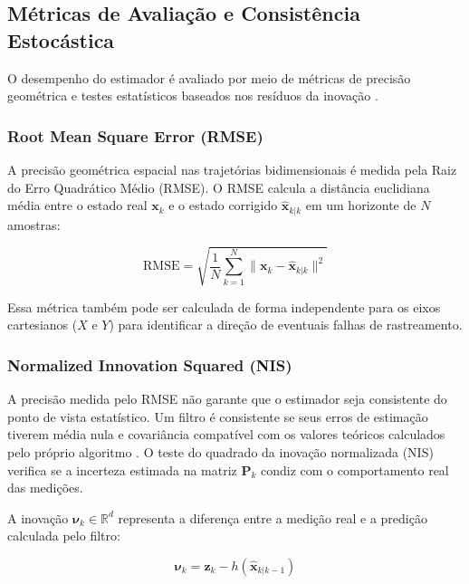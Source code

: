 \subsection{Métricas de Avaliação e Consistência Estocástica}
\label{subsec:metricas_validacao}

O desempenho do estimador é avaliado por meio de métricas de precisão geométrica e testes estatísticos baseados nos resíduos da inovação \cite{barshalom2001estimation}.

\subsubsection{Root Mean Square Error (RMSE)}

A precisão geométrica espacial nas trajetórias bidimensionais é medida pela Raiz do Erro Quadrático Médio (RMSE). O RMSE calcula a distância euclidiana média entre o estado real $\mathbf{x}_k$ e o estado corrigido $\hat{\mathbf{x}}_{k|k}$ em um horizonte de $N$ amostras:

\begin{equation}
    \label{eq:rmse}
    \text{RMSE} = \sqrt{\frac{1}{N} \sum_{k=1}^{N} \|\mathbf{x}_k - \hat{\mathbf{x}}_{k|k}\|^2}
\end{equation}

Essa métrica também pode ser calculada de forma independente para os eixos cartesianos ($X$ e $Y$) para identificar a direção de eventuais falhas de rastreamento.

\subsubsection{Normalized Innovation Squared (NIS)}

A precisão medida pelo RMSE não garante que o estimador seja consistente do ponto de vista estatístico. Um filtro é consistente se seus erros de estimação tiverem média nula e covariância compatível com os valores teóricos calculados pelo próprio algoritmo \cite{barshalom2001estimation}. O teste do quadrado da inovação normalizada (NIS) verifica se a incerteza estimada na matriz $\mathbf{P}_k$ condiz com o comportamento real das medições.

A inovação $\boldsymbol{\nu}_k \in \mathbb{R}^d$ representa a diferença entre a medição real e a predição calculada pelo filtro:

\begin{equation}
    \label{eq:inovacao}
    \boldsymbol{\nu}_k = \mathbf{z}_k - h(\hat{\mathbf{x}}_{k|k-1})
\end{equation}

